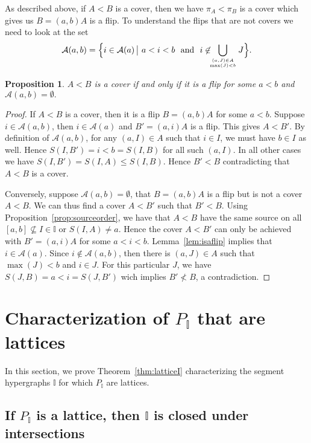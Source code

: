 \documentclass[reqno]{amsart}
\newtheorem{proposition}[theorem]{Proposition}
\theoremstyle{definition}
\newcommand{\II}{\mathbb I} %
\newcommand{\cA}{\mathcal A} %
\begin{document}
As described above, if $A<B$ is a cover, then we have $\pi_A<\pi_B$ is a cover which gives us $B=(a,b)A$ is a  flip.
To understand the flips that are not covers we need to look at the set
 $$\cA(a,b)= \Big\{ i\in \cA (a) \,\big|\  a<i<b\  \text { and }\  i\not\in \!\!\!\bigcup_{(a,J)\in A \atop \max(J)<b} J \Big\}.$$
 
\begin{proposition} \label{prop:segcover}
$A<B$  is a cover if and only if it is a flip for some $a<b$ and $ \cA(a,b)=\emptyset.$
\end{proposition}

\begin{proof}
If $A<B$  is a cover, then it is a flip $B=(a,b)A$ for some $a<b$.
Suppose $i\in  \cA(a,b)$, then $i\in \cA(a)$ and $B'=(a,i)A$ is a flip. This gives $A<B'$. By definition of $\cA(a,b)$, for any $(a,I)\in A$ such that $i\in I$, we must have $b\in I$ as well.
Hence $S(I,B')=i<b=S(I,B)$ for all such $(a,I)$. In all other cases we have $S(I,B')=S(I,A)\le S(I,B)$. Hence $B'<B$ contradicting that $A<B$ is a cover.

Conversely, suppose $ \cA(a,b)=\emptyset$, that $B=(a,b)A$ is a flip but  is not a cover $A<B$.
We can thus find a cover $A<B'$ such that $B'<B$.
Using Proposition~\ref{prop:sourceorder}, we have that $A<B$ have the same source on all $[a,b]\not\subseteq I\in \II$ or $S(I,A)\ne a$. 
Hence the cover $A<B'$ can only be achieved with $B'=(a,i)A$ for some $a<i<b$. Lemma~\ref{lem:isaflip} implies that $i\in \cA(a)$.
Since $i\not\in \cA(a,b)$, then there is $(a,J)\in A$ such that $\max(J)<b$ and $i\in J$. For this particular $J$, we have $S(J,B) = a < i = S(J,B')$
wich implies $B'\not < B$, a contradiction.
\end{proof}


\section{Characterization of  $P_\II$ that are lattices}
\label{sec:LatticePI}

In this section, we  prove  Theorem~\ref{thm:latticeI} characterizing the segment hypergraphs $\II$ for which $P_\II$ are lattices.

\subsection{If $P_\II$ is a lattice, then $\II$ is closed under intersections}  
\label{subsec:latticeI}
\end{document}
